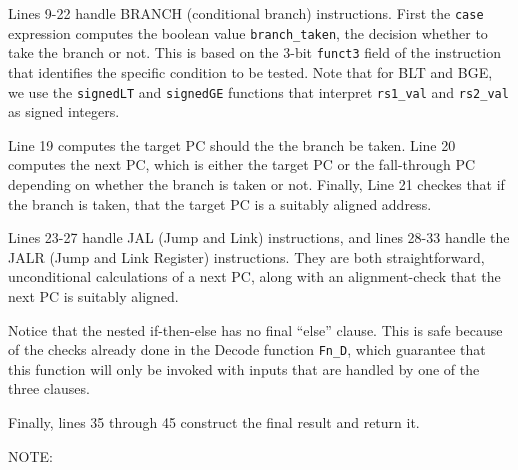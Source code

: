 Lines 9-22 handle BRANCH (conditional branch) instructions.  First the
\verb|case| expression computes the boolean value \verb|branch_taken|,
the decision whether to take the branch or not.  This is based on the
3-bit \verb|funct3| field of the instruction that identifies the
specific condition to be tested.  Note that for BLT and BGE, we use
the \verb|signedLT| and \verb|signedGE| functions that interpret
\verb|rs1_val| and \verb|rs2_val| as signed integers.

Line 19 computes the target PC should the the branch be taken.  Line
20 computes the next PC, which is either the target PC or the
fall-through PC depending on whether the branch is taken or not.
Finally, Line 21 checkes that if the branch is taken, that the target
PC is a suitably aligned address.

Lines 23-27 handle JAL (Jump and Link) instructions, and lines 28-33
handle the JALR (Jump and Link Register) instructions.  They are both
straightforward, unconditional calculations of a next PC, along with
an alignment-check that the next PC is suitably aligned.

Notice that the nested if-then-else has no final ``else'' clause.
This is safe because of the checks already done in the Decode function
\verb|Fn_D|, which guarantee that this function will only be invoked
with inputs that are handled by one of the three clauses.

Finally, lines 35 through 45 construct the final result and return it.

\vspace*{2ex}

NOTE:

